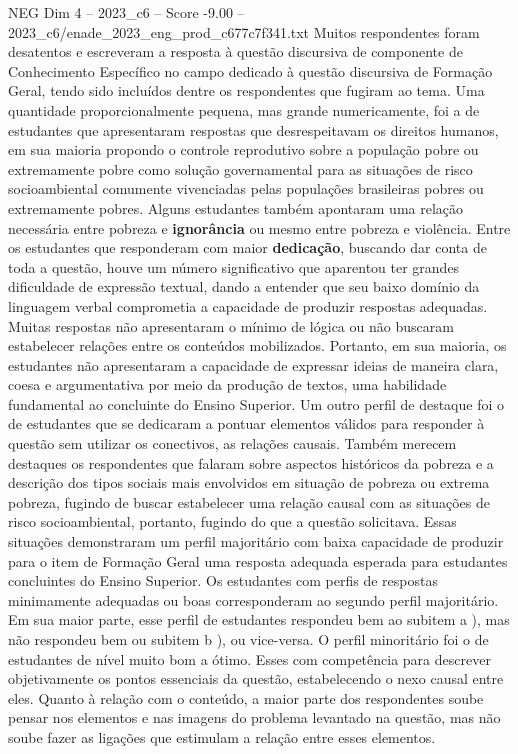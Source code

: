 \begin{textsample}{NEG Dim 4 – 2023\_c6 – Score -9.00 – 2023\_c6/enade\_2023\_eng\_prod\_c677c7f341.txt}
Muitos respondentes foram desatentos e escreveram a resposta à questão discursiva de componente de Conhecimento Específico no campo dedicado à questão discursiva de Formação Geral, tendo sido incluídos dentre os respondentes que fugiram ao tema.
Uma quantidade proporcionalmente pequena, mas grande numericamente, foi a de estudantes que apresentaram respostas que desrespeitavam os direitos humanos, em sua maioria propondo o controle reprodutivo sobre a população pobre ou extremamente pobre como solução governamental para as situações de risco socioambiental comumente vivenciadas pelas populações brasileiras pobres ou extremamente pobres.
Alguns estudantes também apontaram uma relação necessária entre pobreza e \textbf{ignorância} ou mesmo entre pobreza e violência.
Entre os estudantes que responderam com maior \textbf{dedicação}, buscando dar conta de toda a questão, houve um número significativo que aparentou ter grandes dificuldade de expressão textual, dando a entender que seu baixo domínio da linguagem verbal comprometia a capacidade de produzir respostas adequadas.
Muitas respostas não apresentaram o mínimo de lógica ou não buscaram estabelecer relações entre os conteúdos mobilizados.
Portanto, em sua maioria, os estudantes não apresentaram a capacidade de expressar ideias de maneira clara, coesa e argumentativa por meio da produção de textos, uma habilidade fundamental ao concluinte do Ensino Superior.
Um outro perfil de destaque foi o de estudantes que se dedicaram a pontuar elementos válidos para responder à questão sem utilizar os conectivos, as relações causais.
Também merecem destaques os respondentes que falaram sobre aspectos históricos da pobreza e a descrição dos tipos sociais mais envolvidos em situação de pobreza ou extrema pobreza, fugindo de buscar estabelecer uma relação causal com as situações de risco socioambiental, portanto, fugindo do que a questão solicitava.
Essas situações demonstraram um perfil majoritário com baixa capacidade de produzir para o item de Formação Geral uma resposta adequada esperada para estudantes concluintes do Ensino Superior.
Os estudantes com perfis de respostas minimamente adequadas ou boas corresponderam ao segundo perfil majoritário.
Em sua maior parte, esse perfil de estudantes respondeu bem ao subitem a ), mas não respondeu bem ou subitem b ), ou vice-versa.
O perfil minoritário foi o de estudantes de nível muito bom a ótimo.
Esses com competência para descrever objetivamente os pontos essenciais da questão, estabelecendo o nexo causal entre eles.
Quanto à relação com o conteúdo, a maior parte dos respondentes soube pensar nos elementos e nas imagens do problema levantado na questão, mas não soube fazer as ligações que estimulam a relação entre esses elementos.

\end{textsample}
